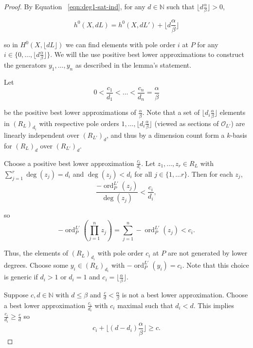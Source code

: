 \documentclass{amsart}
\theoremstyle{plain}
\theoremstyle{definition}
\theoremstyle{remark}
\numberwithin{equation}{section}
\newcommand\so{{\mathscr O}}
\DeclareMathOperator{\ord}{ord}
\newcommand \halfcan{L}
\begin{document}
\begin{proof}
By
Equation ~\ref{eqn:deg1-sat-ind}, for any $d
\in \mathbb{N}$ such that $\lfloor d \frac{ \alpha}{\beta} \rfloor > 0$,

\[
	h^0 (X, d \halfcan ) = h^0(X, d\halfcan') + \lfloor d\frac{\alpha}{\beta}\rfloor
\]

\noindent
so in $H^0 (X, \lfloor d\halfcan \rfloor)$ we can find elements with pole
order $i$ at $P$ for any $i \in \{0, \ldots, \lfloor d \frac{\alpha}{
\beta} \rfloor \}$. We will the use positive best lower approximations to
construct the generators $y_1, \ldots, y_n$ as described in the lemma's statement.

Let 
\[
	0 < \frac{c_1}{d_1} < \ldots < \frac{c_n}{d_n} = \frac{\alpha}{
	\beta}
\]

\noindent
be the positive best lower approximations of $\frac{
\alpha}{\beta}$. Note that a set of $\lfloor d_i \frac{\alpha}{\beta}\rfloor$ elements in $(R_{\halfcan})_{d_i}$ with respective pole orders $1, \ldots, \lfloor
d_i \frac{\alpha}{\beta} \rfloor$ (viewed as sections of $\so_{L'}$) are linearly independent over $(R_{\halfcan'})_d$, and thus by a dimension count form a $k$-basis for
$(R_{\halfcan})_d$ over $(R_{\halfcan'})_d$.

Choose a positive best lower approximation $\frac{c_i}{d_i}$.  Let $z_1, \ldots, z_r \in R_\halfcan$ with $\sum_{j=1}^r \deg(z_j) = d_i$ and $\deg(z_j)<d_i$ for all $j\in \{1, \ldots r\}$.  Then for each $z_j$,
\[
	\frac{-\ord_P^{\halfcan'}(z_j)}{\deg(z_j)} < \frac{c_i}{d_i},
\]

\noindent
so
\[
	-\ord^{\halfcan'}_P(\prod_{j=1}^n z_j) = \sum_{j=1}^n -\ord^{\halfcan'}_P(z_j) < c_i .
\]

\noindent
Thus, the elements of $(R_{\halfcan})_{d_i}$ with pole order $c_i$ at $P$ are not generated by 
lower degrees. 
Choose some $y_i \in(R_{
\halfcan})_{d_i}$ with $-\ord_{P}^{L'}(y_i)=c_i$.  Note that this choice is generic if $d_i>1$ or $d_i=1$ and $c_i=\lfloor \frac{\alpha}{\beta}\rfloor$. 

Suppose $c,d\in \mathbb{N}$ with $d\le \beta$ and $\frac{c}{d} < \frac{\alpha}{
\beta}$ is not a best lower approximation.  Choose a
best lower approximation $\frac{c_i}{d_i}$ with $c_i$ maximal such that $d_i< d$.  This implies $\frac{c_i}{d_i}\ge \frac{c}{d}$ so 
\begin{equation}\label{eqn:c-from-lower-terms}
	c_i +\lfloor (d-d_i) \frac{\alpha}{\beta} \rfloor \ge c.
\end{equation}


\end{proof}
\end{document}

